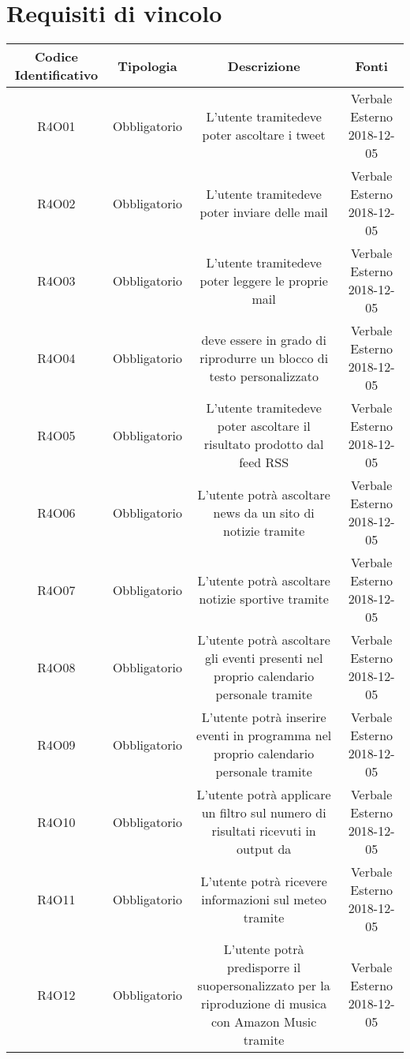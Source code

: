 \section{Requisiti di vincolo}
\begin{tabularx}{\textwidth}{|C|C|C|C|}
	\hline
	\textbf{Codice Identificativo}& \textbf{Tipologia} & \textbf{Descrizione} & \textbf{Fonti}\\
	\hline	
	\endhead
	R4O01&Obbligatorio  &L'utente tramitedeve poter ascoltare i tweet & Verbale Esterno 2018-12-05 \\
	\hline
	R4O02&Obbligatorio  &L'utente tramitedeve poter inviare delle mail & Verbale Esterno 2018-12-05 \\
	\hline
	R4O03&Obbligatorio  &L'utente tramitedeve poter leggere le proprie mail & Verbale Esterno 2018-12-05 \\
	\hline
	R4O04&Obbligatorio  & deve essere in grado di riprodurre un blocco di testo personalizzato & Verbale Esterno 2018-12-05 \\
	\hline
	R4O05&Obbligatorio  &L'utente tramitedeve poter ascoltare il risultato prodotto dal feed RSS & Verbale Esterno 2018-12-05 \\
	\hline
	R4O06 &Obbligatorio& L'utente potrà ascoltare news da un sito di notizie tramite &Verbale Esterno 2018-12-05\\
	\hline
	R4O07 &Obbligatorio& L'utente potrà ascoltare notizie sportive tramite &Verbale Esterno 2018-12-05\\
	\hline
	R4O08 &Obbligatorio&L'utente potrà ascoltare gli eventi presenti nel proprio calendario personale tramite  &Verbale Esterno 2018-12-05\\
	\hline
	R4O09 &Obbligatorio& L'utente potrà inserire eventi in programma nel proprio calendario personale  tramite& Verbale Esterno 2018-12-05\\
	\hline
	R4O10 &Obbligatorio &L'utente potrà applicare un filtro sul numero di risultati ricevuti in output da &Verbale Esterno 2018-12-05\\
	\hline
	R4O11 &Obbligatorio &L'utente potrà ricevere informazioni sul meteo tramite & Verbale Esterno 2018-12-05\\
	\hline
	R4O12&Obbligatorio&L'utente potrà predisporre il suopersonalizzato per la riproduzione di musica con Amazon Music tramite& Verbale Esterno 2018-12-05 \\

\end{tabularx}
